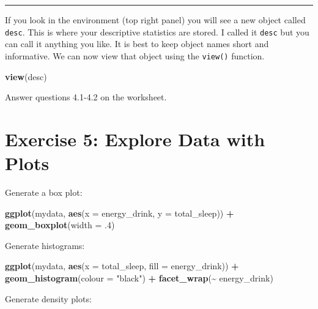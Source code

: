 \documentclass[
]{book}
\newenvironment{Shaded}{\begin{snugshade}}{\end{snugshade}}
\newcommand{\AttributeTok}[1]{\textcolor[rgb]{0.13,0.29,0.53}{#1}}
\newcommand{\DecValTok}[1]{\textcolor[rgb]{0.00,0.00,0.81}{#1}}
\newcommand{\FunctionTok}[1]{\textcolor[rgb]{0.13,0.29,0.53}{\textbf{#1}}}
\newcommand{\NormalTok}[1]{#1}
\newcommand{\SpecialCharTok}[1]{\textcolor[rgb]{0.81,0.36,0.00}{\textbf{#1}}}
\newcommand{\StringTok}[1]{\textcolor[rgb]{0.31,0.60,0.02}{#1}}
\let\oldsection\section
\renewcommand{\section}{\needspace{5\baselineskip}\oldsection}
\begin{document}
\begin{center}\rule{0.5\linewidth}{0.5pt}\end{center}

If you look in the environment (top right panel) you will see a new object called \texttt{desc}. This is where your descriptive statistics are stored. I called it \texttt{desc} but you can call it anything you like. It is best to keep object names short and informative. We can now view that object using the \texttt{view()} function.

\begin{Shaded}
\begin{Highlighting}[]
\FunctionTok{view}\NormalTok{(desc)}
\end{Highlighting}
\end{Shaded}

Answer questions 4.1-4.2 on the worksheet.

\section{Exercise 5: Explore Data with Plots}\label{exercise-5-explore-data-with-plots}

Generate a box plot:

\begin{Shaded}
\begin{Highlighting}[]
\FunctionTok{ggplot}\NormalTok{(mydata, }\FunctionTok{aes}\NormalTok{(}\AttributeTok{x =}\NormalTok{ energy\_drink, }\AttributeTok{y =}\NormalTok{ total\_sleep)) }\SpecialCharTok{+}
  \FunctionTok{geom\_boxplot}\NormalTok{(}\AttributeTok{width =}\NormalTok{ .}\DecValTok{4}\NormalTok{)}
\end{Highlighting}
\end{Shaded}

Generate histograms:

\begin{Shaded}
\begin{Highlighting}[]
\FunctionTok{ggplot}\NormalTok{(mydata, }\FunctionTok{aes}\NormalTok{(}\AttributeTok{x =}\NormalTok{ total\_sleep, }\AttributeTok{fill =}\NormalTok{ energy\_drink)) }\SpecialCharTok{+}
  \FunctionTok{geom\_histogram}\NormalTok{(}\AttributeTok{colour =} \StringTok{"black"}\NormalTok{) }\SpecialCharTok{+}
  \FunctionTok{facet\_wrap}\NormalTok{(}\SpecialCharTok{\textasciitilde{}}\NormalTok{ energy\_drink)}
\end{Highlighting}
\end{Shaded}

Generate density plots:
\end{document}
